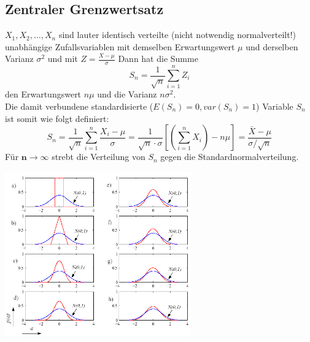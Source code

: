 	\subsection{Zentraler Grenzwertsatz}
		\begin{minipage}[]{11cm}
			$X_1, X_2, \ldots , X_n$ sind lauter identisch verteilte (nicht notwendig normalverteilt!)
			unabhängige Zufallsvariablen mit demselben Erwartungswert $\mu$ und derselben Varianz $\sigma^2$
			und mit $Z = \frac{X-\mu}{\sigma}$
		  	Dann hat die Summe
			\begin{equation}
				S_n = \frac{1}{\sqrt{n}}\sum_{i=1}^n Z_i \nonumber
			\end{equation}
			den Erwartungswert $n \mu$ und die Varianz $n \sigma^2$. \\
		  	Die damit verbundene standardisierte ($E(S_n) = 0, var(S_n) = 1$) Variable $S_n$ ist somit wie
		  	folgt definiert: \\ 
			\begin{equation}
				S_n = \frac{1}{\sqrt{n}}\sum_{i=1}^n \frac{X_i - \mu}{\sigma}
				= \frac{1}{\sqrt{n}\cdot \sigma}\left[\left(\sum\limits_{i=1}^n X_i\right) -n \mu\right]
				=\dfrac{\bar{X} - \mu}{\sigma / \sqrt{n}} \nonumber
			\end{equation}
		  	Für $\boldsymbol{n \to \infty}$ strebt die Verteilung von $S_n$ gegen die Standardnormalverteilung. \\
		  \end{minipage}
		  \begin{minipage}[]{8cm}
		  	\includegraphics[width=8cm]{./bilder/grenzwertsatz.png}
		  \end{minipage}
	  	
